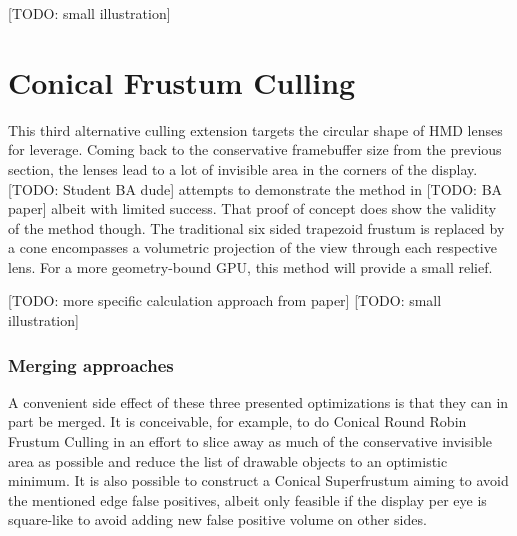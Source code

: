[TODO: small illustration]



\section{Conical Frustum Culling}
This third alternative culling extension targets the circular shape of HMD lenses for leverage. Coming back to the conservative framebuffer size from the previous section, the lenses lead to a lot of invisible area in the corners of the display. [TODO: Student BA dude] attempts to demonstrate the method in [TODO: BA paper] albeit with limited success. That proof of concept does show the validity of the method though. The traditional six sided trapezoid frustum is replaced by a cone encompasses a volumetric projection of the view through each respective lens. For a more geometry-bound GPU, this method will provide a small relief. 

[TODO: more specific calculation approach from paper]
[TODO: small illustration]

\subsubsection{Merging approaches}
A convenient side effect of these three presented optimizations is that they can in part be merged. It is conceivable, for example, to do Conical Round Robin Frustum Culling in an effort to slice away as much of the conservative invisible area as possible and reduce the list of drawable objects to an optimistic minimum. It is also possible to construct a Conical Superfrustum aiming to avoid the mentioned edge false positives, albeit only feasible if the display per eye is square-like to avoid adding new false positive volume on other sides.
